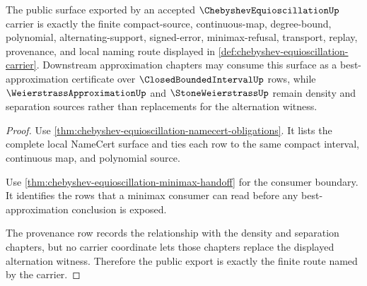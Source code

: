 \begin{theorem}
\label{thm:chebyshev-equioscillation-public-export}
The public surface exported by an accepted $\ChebyshevEquioscillationUp$ carrier is exactly the finite compact-source, continuous-map, degree-bound, polynomial, alternating-support, signed-error, minimax-refusal, transport, replay, provenance, and local naming route displayed in \autoref{def:chebyshev-equioscillation-carrier}. Downstream approximation chapters may consume this surface as a best-approximation certificate over $\ClosedBoundedIntervalUp$ rows, while $\WeierstrassApproximationUp$ and $\StoneWeierstrassUp$ remain density and separation sources rather than replacements for the alternation witness.
\end{theorem}
\begin{proof}
Use \autoref{thm:chebyshev-equioscillation-namecert-obligations}. It lists the complete local NameCert surface and ties each row to the same compact interval, continuous map, and polynomial source.

Use \autoref{thm:chebyshev-equioscillation-minimax-handoff} for the consumer boundary. It identifies the rows that a minimax consumer can read before any best-approximation conclusion is exposed.

The provenance row records the relationship with the density and separation chapters, but no carrier coordinate lets those chapters replace the displayed alternation witness. Therefore the public export is exactly the finite route named by the carrier.
\end{proof}





